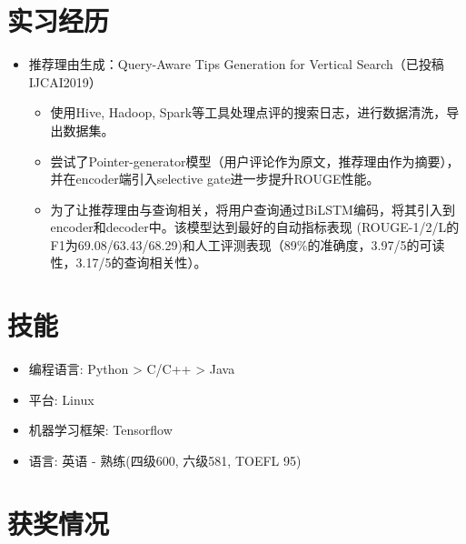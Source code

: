 \documentclass{resume}
\begin{document}
\section{实习经历}
\begin{itemize}
\item 推荐理由生成：Query-Aware Tips Generation for Vertical Search（已投稿IJCAI2019）
\begin{itemize}
\item 使用Hive, Hadoop, Spark等工具处理点评的搜索日志，进行数据清洗，导出数据集。
\item 尝试了Pointer-generator模型（用户评论作为原文，推荐理由作为摘要），并在encoder端引入selective gate进一步提升ROUGE性能。
\item 为了让推荐理由与查询相关，将用户查询通过BiLSTM编码，将其引入到encoder和decoder中。该模型达到最好的自动指标表现 (ROUGE-1/2/L的F1为69.08/63.43/68.29)和人工评测表现（89\%的准确度，3.97/5的可读性，3.17/5的查询相关性）。
\end{itemize}
\end{itemize}


\section{技能}
\begin{itemize}[parsep=0.5ex]
  \item 编程语言: Python > C/C++ > Java
  \item 平台: Linux
  \item 机器学习框架: Tensorflow
  \item 语言: 英语 - 熟练(四级600, 六级581, TOEFL 95)

\end{itemize}

\section{获奖情况}

%
%
\end{document}
